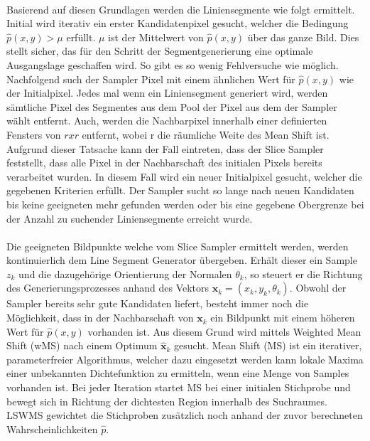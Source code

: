 \paragraph{}
Basierend auf diesen Grundlagen werden die Liniensegmente wie folgt ermittelt. Initial wird iterativ ein erster Kandidatenpixel gesucht, welcher die Bedingung $\hat{p}(x, y) > \mu$ erfüllt. $\mu$ ist der Mittelwert von $\hat{p}(x, y)$ über das ganze Bild. Dies stellt sicher, das für den Schritt der Segmentgenerierung eine optimale Ausgangslage geschaffen wird. So gibt es so wenig Fehlversuche wie möglich. Nachfolgend such der Sampler Pixel mit einem ähnlichen Wert für $\hat{p}(x, y)$ wie der Initialpixel. Jedes mal wenn ein Liniensegment generiert wird, werden sämtliche Pixel des Segmentes aus dem Pool der Pixel aus dem der Sampler wählt entfernt. Auch, werden die Nachbarpixel innerhalb einer definierten Fensters von $r x r$ entfernt, wobei r die räumliche Weite des Mean Shift ist. Aufgrund dieser Tatsache kann der Fall eintreten, dass der Slice Sampler feststellt, dass alle Pixel in der Nachbarschaft des initialen Pixels bereits verarbeitet wurden. In diesem Fall wird ein neuer Initialpixel gesucht, welcher die gegebenen Kriterien erfüllt. Der Sampler sucht so lange nach neuen Kandidaten bis keine geeigneten mehr gefunden werden oder bis eine gegebene Obergrenze bei der Anzahl zu suchender Liniensegmente erreicht wurde.
\paragraph{}
Die geeigneten Bildpunkte welche vom Slice Sampler ermittelt werden, werden kontinuierlich dem Line Segment Generator übergeben. Erhält dieser ein Sample $z_k$ und die dazugehörige Orientierung der Normalen $\theta_k$, so steuert er die Richtung des Generierungsprozesses anhand des Vektors $\textbf{x}_{k} = (x_k, y_k, \theta_k)$. Obwohl der Sampler bereits sehr gute Kandidaten liefert, besteht immer noch die Möglichkeit, dass in der Nachbarschaft von $\textbf{x}_k$ ein Bildpunkt mit einem höheren Wert für $\hat{p}(x, y)$ vorhanden ist. Aus diesem Grund wird mittels Weighted Mean Shift (wMS) nach einem Optimum $\hat{\textbf{x}}_k$ gesucht. Mean Shift (MS) ist ein iterativer, parameterfreier Algorithmus, welcher dazu eingesetzt werden kann lokale Maxima einer unbekannten Dichtefunktion zu ermitteln, wenn eine Menge von Samples vorhanden ist. Bei jeder Iteration startet MS bei einer initialen Stichprobe und bewegt sich in Richtung der dichtesten Region innerhalb des Suchraumes. LSWMS gewichtet die Stichproben zusätzlich noch anhand der zuvor berechneten Wahrscheinlichkeiten $\hat{p}$.
